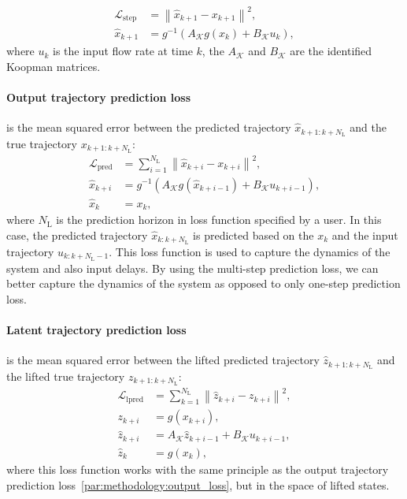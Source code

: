 \documentclass[conference]{IEEEtran}
\newcommand{\ui}[2]{#1_{\text{#2}}}  %
\begin{document}
\begin{subequations}
    \begin{align}
        \mathcal{L}_{\text{step}} & = \left \|\hat{x}_{k+1} - x_{k+1}\right \|^2,     \\
        \hat{x}_{k+1}             & = g^{-1}(A_\mathcal{K}g(x_k) + B_\mathcal{K}u_k),
    \end{align}
\end{subequations}
where \(u_k\) is the input flow rate at time \(k\), the \(A_\mathcal{K}\) and \(B_\mathcal{K}\) are the identified Koopman matrices.

\paragraph*{Output trajectory prediction loss}\label{par:methodology:output_loss}
is the mean squared error between the predicted trajectory \(\hat{x}_{k+1:k+\ui{N}{L}}\) and the true trajectory \(x_{k+1:k+\ui{N}{L}}\):
\begin{subequations}
    \begin{align}
        \mathcal{L}_{\text{pred}} & = \sum_{i=1}^{\ui{N}{L}}\left \|\hat{x}_{k+i} - x_{k+i}\right \|^2,            \\
        \hat{x}_{k+i}             & = g^{-1}\left(A_\mathcal{K}g(\hat{x}_{k+i-1}) + B_\mathcal{K}u_{k+i-1}\right), \\
        \hat{x}_{k}               & = x_{k},
    \end{align}
\end{subequations}
where \(\ui{N}{L}\) is the prediction horizon in loss function specified by a user. In this case, the predicted trajectory \(\hat{x}_{k:k+\ui{N}{L}}\) is predicted based on the \(x_k\) and the input trajectory \(u_{k:k+\ui{N}{L}-1}\). This loss function is used to capture the dynamics of the system and also input delays. By using the multi-step prediction loss, we can better capture the dynamics of the system as opposed to only one-step prediction loss.

\paragraph*{Latent trajectory prediction loss}
is the mean squared error between the lifted predicted trajectory \(\hat{z}_{k+1:k+\ui{N}{L}}\) and the lifted true trajectory \(z_{k+1:k+\ui{N}{L}}\):
\begin{subequations}
    \begin{align}
        \mathcal{L}_{\text{lpred}} & = \sum_{k=1}^{\ui{N}{L}}\left \|\hat{z}_{k+i} - z_{k+i}\right \|^2, \\
        z_{k+i}                    & = g(x_{k+i}),                                                       \\
        \hat{z}_{k+i}              & = A_{\mathcal{K}}\hat{z}_{k+i-1}+B_{\mathcal{K}}u_{k+i-1},          \\
        \hat{z}_{k}                & = g(x_{k}),
    \end{align}
\end{subequations}
where this loss function works with the same principle as the output trajectory prediction loss~\ref{par:methodology:output_loss}, but in the space of lifted states.
\end{document}
